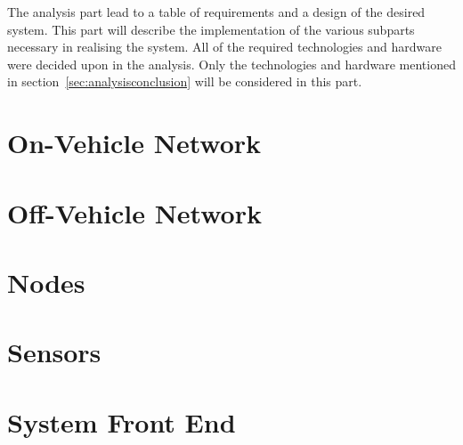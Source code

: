 The analysis part lead to a table of requirements and a design of the desired system.
This part will describe the implementation of the various subparts necessary in realising the system.
All of the required technologies and hardware were decided upon in the analysis.
Only the technologies and hardware mentioned in section~\ref{sec:analysisconclusion} will be considered in this part.
\section{On-Vehicle Network}






\section{Off-Vehicle Network}
\label{sec:wifi}

\section{Nodes}

\section{Sensors}

\section{System Front End}
